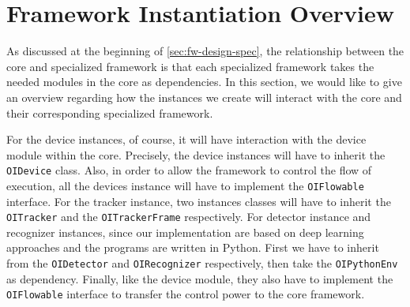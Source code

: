 \begin{table}
    \caption{Directory structure and their functionalities.}
    \label{tab:fw-dir}
\end{table}

\section{Framework Instantiation Overview}
\label{sec:fw-inst-core-and-spec-rel}

As discussed at the beginning of \autoref{sec:fw-design-spec}, the 
relationship between the core and specialized framework is that each
specialized framework takes the needed modules in the core as dependencies.
In this section, we would like to give an overview regarding how the instances 
we create will interact with the core and their corresponding specialized 
framework.

For the device instances, of course, it will have interaction with the
device module within the core. Precisely, the device instances will have to 
inherit the \texttt{OIDevice} class. Also, in order to allow the framework
to control the flow of execution, all the devices instance will have to
implement the \texttt{OIFlowable} interface.
For the tracker instance, two instances classes will have to inherit the
\texttt{OITracker} and the \texttt{OITrackerFrame} respectively.
For detector instance and recognizer instances, since our implementation are
based on deep learning approaches and the programs are written in Python.
First we have to inherit from the \texttt{OIDetector} and \texttt{OIRecognizer}
respectively, then take the \texttt{OIPythonEnv} as dependency. 
Finally, like the device module, they also have to implement the 
\texttt{OIFlowable} interface to transfer the control power to the core 
framework.

